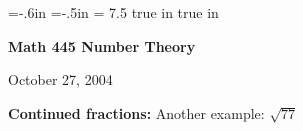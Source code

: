 \def\cmb{\MidnightBlue}	  %
\def\cnb{\NavyBlue}	  %
\def\crb{\RoyalBlue}	  %
\def\cce{\Cerulean}	  %
\def\ccy{\Cyan}		  %
\def\cpb{\ProcessBlue}	  %
\def\csb{\SkyBlue}	  %
\def\ctu{\Turquoise}	  %
\def\ctb{\TealBlue}	  %
\def\caq{\Aquamarine}	  %
\def\cbg{\BlueGreen}	  %
\def\cem{\Emerald}	  %
\def\cjg{\JungleGreen}	  %
\def\csg{\SeaGreen}	  %
\def\cgg{\Green}	  %
\def\cfg{\ForestGreen}	  %
\def\cpg{\PineGreen}	  %
\def\clg{\LimeGreen}	  %
\def\cyg{\YellowGreen}	  %
\def\cspg{\SpringGreen}	  %
\def\cog{\OliveGreen}	  %
\def\pars{\RawSienna}	  %
\def\cse{\Sepia}		  %
\def\cbr{\Brown}		  %
\def\cta{\Tan}		  %
\def\cgr{\Gray}		  %
\def\cbl{\Black}		  %
\def\cwh{\White}		  %


\voffset=-.6in
\hoffset=-.5in
\hsize = 7.5 true in
 true in


\overfullrule=0pt


\def\ctln{\centerline}
\def\u{\underbar}
\def\ssk{\smallskip}
\def\msk{\medskip}
\def\bsk{\bigskip}
\def\hsk{\hskip.1in}
\def\hhsk{\hskip.2in}
\def\dsl{\displaystyle}

\def\lra{$\Leftrightarrow$ }


\ctln{\bf Math 445 Number Theory}

\smallskip

\ctln{October 27, 2004}

\medskip

{\bf Continued fractions:} Another example: $\sqrt{77}$

